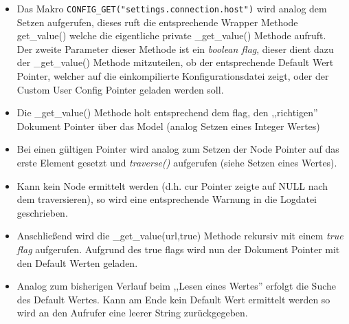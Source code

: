 \begin{itemize}
    \item Das Makro \verb+CONFIG_GET("settings.connection.host")+ wird analog dem Setzen aufgerufen, dieses ruft die entsprechende Wrapper
        Methode get\_value() welche die eigentliche private \_get\_value() Methode aufruft.
        \\
        Der zweite Parameter dieser Methode ist ein \emph{boolean flag}, dieser dient dazu der \_get\_value()
        Methode mitzuteilen, ob der entsprechende Default Wert Pointer, welcher auf die einkompilierte
        Konfigurationsdatei zeigt, oder der Custom User Config Pointer geladen werden soll.
    \item Die \_get\_value() Methode holt entsprechend dem flag, den ,,richtigen'' Dokument Pointer über das Model (analog Setzen eines Integer Wertes)
    \item Bei einen gültigen Pointer wird analog zum Setzen der Node Pointer auf das erste Element gesetzt und \textit{traverse()}
        aufgerufen (siehe Setzen eines Wertes).
    \item Kann kein Node ermittelt werden (d.h. cur Pointer zeigte auf NULL nach dem traversieren), so wird eine entsprechende Warnung in die Logdatei geschrieben.
    \item Anschließend wird die \_get\_value(url,true) Methode rekursiv mit einem \emph{true flag} aufgerufen. Aufgrund des true flags wird nun der Dokument Pointer mit den Default Werten geladen.
    \item Analog zum bisherigen Verlauf beim ,,Lesen eines Wertes'' erfolgt die Suche des Default Wertes. Kann am Ende kein
        Default Wert ermittelt werden so wird an den Aufrufer eine leerer String zurückgegeben.
\end{itemize}










